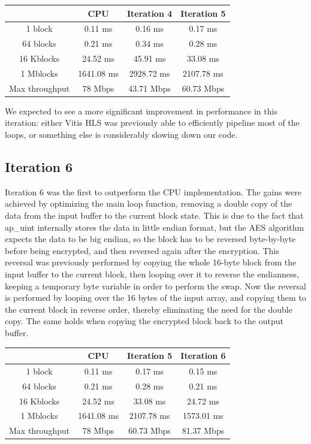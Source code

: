 \documentclass[12pt,oneside,a4paper]{article}
\begin{document}
\begin{table}[H]
	\centering
	\begin{tabular}{cccc}
		\toprule
		 & CPU & Iteration 4 & Iteration 5 \\
		\midrule
		1 block & 0.11 ms & 0.16 ms & 0.17 ms \\
		64 blocks & 0.21 ms & 0.34 ms & 0.28 ms \\
		16 Kblocks & 24.52 ms & 45.91 ms & 33.08 ms \\
		1 Mblocks & 1641.08 ms & 2928.72 ms & 2107.78 ms \\
		Max throughput & 78 Mbps & 43.71 Mbps & 60.73 Mbps \\
		\bottomrule
	\end{tabular}
\end{table}

We expected to see a more significant improvement in performance in this iteration: either Vitis HLS was previously able to efficiently pipeline most of the loops, or something else is considerably slowing down our code.

\subsection{Iteration 6} \label{subsec:iter6}
Iteration 6 was the first to outperform the CPU implementation. The gains were achieved by optimizing the main loop function, removing a double copy of the data from the input buffer to the current block state.
This is due to the fact that ap\_uint internally stores the data in little endian format, but the AES algorithm expects the data to be big endian, so the block has to be reversed byte-by-byte before being encrypted, and then reversed again after the encryption.
This reversal was previously performed by copying the whole 16-byte block from the input buffer to the current block, then looping over it to reverse the endianness, keeping a temporary byte variable in order to perform the swap.
Now the reversal is performed by looping over the 16 bytes of the input array, and copying them to the current block in reverse order, thereby eliminating the need for the double copy. The same holds when copying the encrypted block back to the output buffer.

\begin{table}[H]
	\centering
	\begin{tabular}{cccc}
		\toprule
		 & CPU & Iteration 5 & Iteration 6 \\
		\midrule
		1 block & 0.11 ms & 0.17 ms & 0.15 ms \\
		64 blocks & 0.21 ms & 0.28 ms & 0.21 ms \\
		16 Kblocks & 24.52 ms & 33.08 ms & 24.72 ms \\
		1 Mblocks & 1641.08 ms & 2107.78 ms & 1573.01 ms \\
		Max throughput & 78 Mbps & 60.73 Mbps & 81.37 Mbps \\
		\bottomrule
	\end{tabular}
\end{table}
\end{document}
